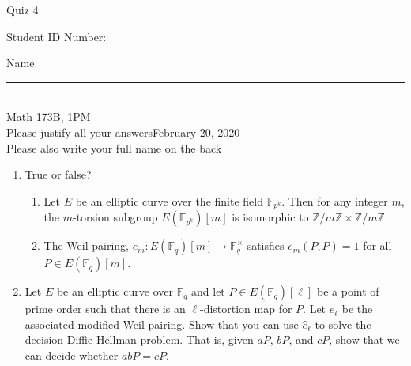 \documentclass[12pt]{article}
\newcommand{\field}{\mathbb{F}}
\newcommand{\integers}{\mathbb{Z}}
\begin{document}
\begin{flushleft} 
\centerline{\LARGE{Quiz 4}} 
\vspace{5 mm}

{Student ID Number:}\hfill  
{Name \rule {2 in}{0.01in}}\\
Math 173B, 1PM
\\
{Please justify all your answers}\hfill {February 20, 2020}
\\
{Please also write your full name on the back} 

\medskip
\end{flushleft}

\begin{enumerate}
	\item True or false?
	\begin{enumerate}
		\item Let $E$ be an elliptic curve over the finite field $\field_{p^k}$. Then for any integer $m$, the $m$-torsion subgroup $E(\field_{p^k})[m]$ is isomorphic to $\integers/m\integers \times \integers/m\integers$.
		\item The Weil pairing, $e_m: E(\field_q)[m]\to \field_q^\times$ satisfies $e_m(P, P) = 1$ for all $P\in E(\field_q)[m]$.
	\end{enumerate}
	\item Let $E$ be an elliptic curve over $\field_{q}$ and let $P\in E(\field_q)[\ell]$ be a point of prime order such that there is an $\ell$-distortion map for $P$. Let $\hat{e}_\ell$ be the associated modified Weil pairing. Show that you can use $\hat{e}_\ell$ to solve the decision Diffie-Hellman problem. That is, given $aP$, $bP$, and $cP$, show that we can decide whether $abP = cP$.
	\vfill
\end{enumerate}

\end{document}
